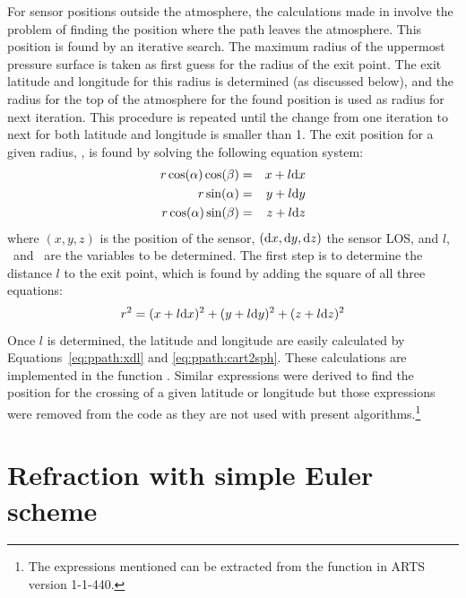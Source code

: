 For sensor positions outside the atmosphere, the calculations made in
 involve the problem of finding the
position where the path leaves the atmosphere. This position is found
by an iterative search. The maximum radius of the uppermost pressure
surface is taken as first guess for the radius of the exit point.  The
exit latitude and longitude for this radius is determined (as
discussed below), and the radius for the top of the atmosphere for the
found position is used as radius for next iteration. This procedure is
repeated until the change from one iteration to next for both latitude
and longitude is smaller than 1. The exit position for
a given radius, \Rds, is found by solving the following equation
system:
\begin{eqnarray}
  r \cos(\alpha) \cos(\beta)  & = & x+l\mathrm{d} x \nonumber \\
  r \sin(\alpha)             & = & y+l\mathrm{d} y \\
  r \cos(\alpha) \sin(\beta)  & = & z+l\mathrm{d} z \nonumber
  \label{eq:ppath:rcoss3Da}
\end{eqnarray}
where $(x,y,z)$ is the position of the sensor, $(\mathrm{d} x,\mathrm{d}
y,\mathrm{d} z)$ the sensor LOS, and $l$, \Lat\ and \Lon\ are the variables
to be determined. The first step is to determine the distance $l$ to
the exit point, which is found by adding the square of all three
equations:
\begin{equation}
  r^2 = (x+l\mathrm{d} x)^2 + (y+l\mathrm{d} y)^2 + (z+l\mathrm{d} z)^2
  \label{eq:ppath:rcoss3Db}
\end{equation}
Once $l$ is determined, the latitude and longitude are easily
calculated by Equations~\ref{eq:ppath:xdl} and
\ref{eq:ppath:cart2sph}. These calculations are implemented in the
function .  Similar expressions were
derived to find the position for the crossing of a given latitude or
longitude but those expressions were removed from the code as they are
not used with present algorithms.\footnote{The expressions mentioned
  can be extracted from the function
   in ARTS version 1-1-440.}



\section{Refraction with simple Euler scheme}
\label{sec:ppath:refreuler}

